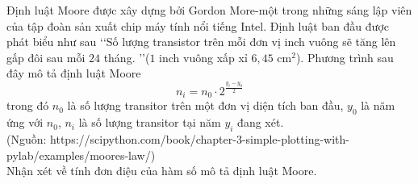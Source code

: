 \begin{bt}%
	Định luật Moore được xây dựng bởi Gordon More-một trong những sáng lập viên của tập đoàn sản xuất chip máy tính nổi tiếng Intel. Định luật ban đầu được phát biểu như sau
	\lq\lq Số lượng transistor trên mỗi đơn vị inch vuông sẽ tăng lên gấp đôi sau mỗi $24$ tháng. \rq\rq ($1$ inch vuông xấp xỉ $6{,}45$ cm$^2$).
	Phương trình sau đây mô tả định luật Moore
	$$n_i=n_0\cdot 2^{\tfrac{y_i-y_0}{2}}$$
	trong đó $n_0$ là số lượng transitor trên một đơn vị diện tích ban đầu, $y_0$ là năm ứng với $n_0$, $n_i$ là số lượng transitor tại năm $y_i$ đang xét. \\
	(Nguồn: https://scipython.com/book/chapter-3-simple-plotting-with-pylab/examples/moores-law/)\\
	Nhận xét về tính đơn điệu của hàm số mô tả định luật Moore.
\end{bt}

